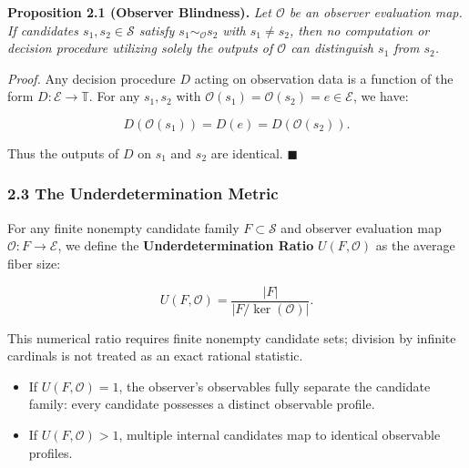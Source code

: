 \documentclass[
  10pt,
]{article}
\begin{document}
\textbf{Proposition 2.1 (Observer Blindness).} \emph{Let \hypertarget{math-E0014-0022}{}{\(\mathcal{O}\)} be an observer evaluation map. If candidates \hypertarget{math-E0021-0023}{}{\(s_1, s_2 \in \mathcal{S}\)} satisfy \hypertarget{math-E0026-0024}{}{\(s_1 \sim_{\mathcal{O}} s_2\)} with \hypertarget{math-E0027-0025}{}{\(s_1 \ne s_2\)}, then no computation or decision procedure utilizing solely the outputs of \hypertarget{math-E0014-0026}{}{\(\mathcal{O}\)} can distinguish \hypertarget{math-E0028-0027}{}{\(s_1\)} from \hypertarget{math-E0029-0028}{}{\(s_2\)}.}

\emph{Proof.} Any decision procedure \hypertarget{math-E0030-0029}{}{\(D\)} acting on observation data is a function of the form \hypertarget{math-E0031-0030}{}{\(D: \mathcal{E} \to \mathbb{T}\)}. For any \hypertarget{math-E0032-0031}{}{\(s_1, s_2\)} with \hypertarget{math-E0033-0032}{}{\(\mathcal{O}(s_1) = \mathcal{O}(s_2) = e \in \mathcal{E}\)}, we have:

\hypertarget{math-E0034-0033}{}{\[D(\mathcal{O}(s_1)) = D(e) = D(\mathcal{O}(s_2)).\]}

Thus the outputs of \hypertarget{math-E0030-0034}{}{\(D\)} on \hypertarget{math-E0028-0035}{}{\(s_1\)} and \hypertarget{math-E0029-0036}{}{\(s_2\)} are identical. \hypertarget{math-E0035-0037}{}{\(\blacksquare\)}

\subsubsection{2.3 The Underdetermination Metric}\label{the-underdetermination-metric}

For any finite nonempty candidate family \hypertarget{math-E0036-0038}{}{\(F \subset \mathcal{S}\)} and observer evaluation map \hypertarget{math-E0037-0039}{}{\(\mathcal{O}: F \to \mathcal{E}\)}, we define the \textbf{Underdetermination Ratio} \hypertarget{math-E0002-0040}{}{\(U(F, \mathcal{O})\)} as the average fiber size:

\hypertarget{math-E0038-0041}{}{\[U(F, \mathcal{O}) = \frac{|F|}{|F / \ker(\mathcal{O})|}.\]}

This numerical ratio requires finite nonempty candidate sets; division by infinite cardinals is not treated as an exact rational statistic.

\begin{itemize}
\item
  If \hypertarget{math-E0039-0042}{}{\(U(F, \mathcal{O}) = 1\)}, the observer's observables fully separate the candidate family: every candidate possesses a distinct observable profile.
\item
  If \hypertarget{math-E0040-0043}{}{\(U(F, \mathcal{O}) > 1\)}, multiple internal candidates map to identical observable profiles.
\end{itemize}
\end{document}
